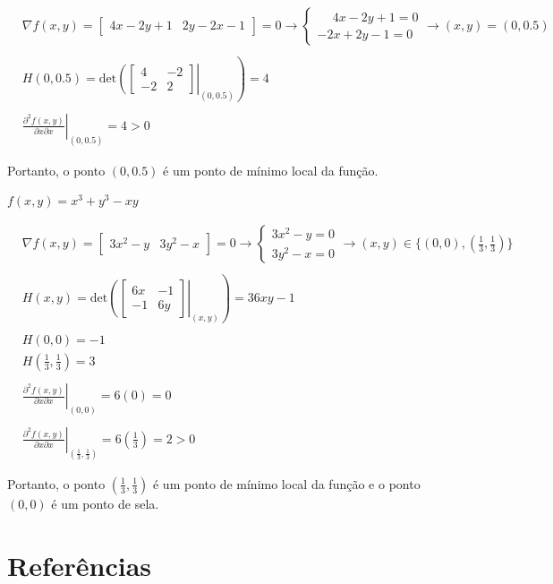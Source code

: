 \documentclass[
  portuguese,
  letterpaper,
  DIV=11,
  numbers=noendperiod]{scrreport}
\begin{document}
\[
\begin{aligned}
& \nabla f(x,y)=
\begin{bmatrix} 4x-2y+1 & 2y-2x-1\end{bmatrix}=0 \rightarrow 
\begin{cases} \phantom{-}4x-2y+1=0 \\ -2x+2y-1 = 0 \end{cases} \rightarrow 
(x,y) = (0, 0.5) & \\ \\
&  H(0, 0.5) = 
\left. \mathrm{det} \left( \begin{bmatrix} 4 & -2 \\ 
                -2 & 2 \end{bmatrix}
\right |_{(0, 0.5)} \right ) = 4 & \\ \\
&\left. \frac{\partial^2 f(x,y)}{\partial x \partial x} \right|_{(0, 0.5)}=
4>0
& \end{aligned}
\]

Portanto, o ponto \((0, 0.5)\) é um ponto de mínimo local da função.

\(f(x,y)=x^3 + y^3 − xy\)

\[
\begin{aligned}
& \nabla f(x,y)=
\begin{bmatrix} 3x^2-y & 3y^2-x \end{bmatrix}=0 \rightarrow 
\begin{cases} 3x^2-y = 0 \\ 3y^2-x = 0 \end{cases} \rightarrow 
(x,y) \in \{(0, 0), (\frac{1}{3},\frac{1}{3})\}& \\ \\
&  H(x,y) = 
\left. \mathrm{det} \left( \begin{bmatrix} 6x & -1 \\ 
                -1 & 6y \end{bmatrix}
\right |_{(x,y)} \right ) = 36xy-1 & \\ \\
& H(0,0) = -1  &\\ 
& H(\frac{1}{3},\frac{1}{3}) = 3  &\\ \\
&\left. \frac{\partial^2 f(x,y)}{\partial x \partial x} \right|_{(0,0)}=
6(0)=0 &\\ \\
&\left. \frac{\partial^2 f(x,y)}{\partial x \partial x} \right|_{(\frac{1}{3},\frac{1}{3})}=
6(\frac{1}{3})=2>0
& \end{aligned}
\]

Portanto, o ponto \((\frac{1}{3},\frac{1}{3})\) é um ponto de mínimo
local da função e o ponto \((0,0)\) é um ponto de sela.


\chapter*{Referências}\label{referuxeancias}


\printbibliography[heading=none]
\end{document}
